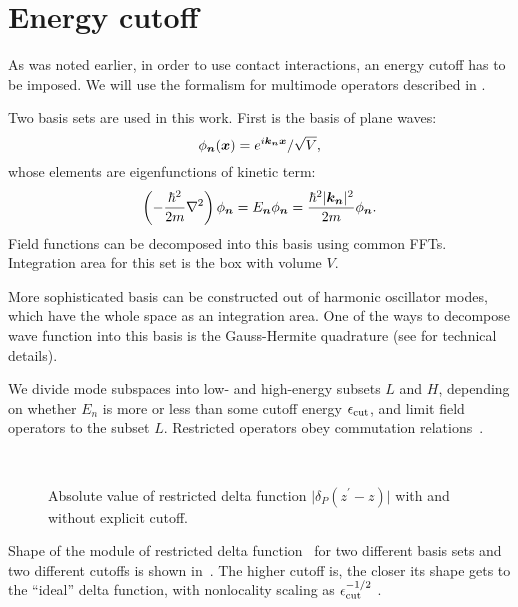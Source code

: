 \section{Energy cutoff}

As was noted earlier, in order to use contact interactions, an energy cutoff has to be imposed.
We will use the formalism for multimode operators described in .

Two basis sets are used in this work.
First is the basis of plane waves:
\[
	\phi_{\boldsymbol{n}}(\boldsymbol{x}) = e^{i \boldsymbol{k}_{\boldsymbol{n}} \boldsymbol{x}} / \sqrt{V},
\]
whose elements are eigenfunctions of kinetic term:
\[
	\left( -\frac{\hbar^2}{2m} \nabla^2 \right) \phi_{\boldsymbol{n}}
	= E_{\boldsymbol{n}} \phi_{\boldsymbol{n}}
	= \frac{\hbar^2 \lvert \boldsymbol{k}_{\boldsymbol{n}} \rvert^2}{2 m} \phi_{\boldsymbol{n}}.
\]
Field functions can be decomposed into this basis using common FFTs.
Integration area for this set is the box with volume $V$.

More sophisticated basis can be constructed out of harmonic oscillator modes,
which have the whole space as an integration area.
One of the ways to decompose wave function into this basis is the Gauss-Hermite quadrature
(see  for technical details).

We divide mode subspaces into low- and high-energy subsets $L$ and $H$,
depending on whether $E_n$ is more or less than some cutoff energy $\epsilon_{\mathrm{cut}}$,
and limit field operators to the subset $L$.
Restricted operators obey commutation relations~.

\begin{figure}
\begin{center}
 \\
\end{center}
\caption{Absolute value of restricted delta function $\lvert \delta_P(z^\prime - z) \rvert$ with and without explicit cutoff.}
\label{fig:wigner-bec:cutoff:restricted-delta}
\end{figure}

Shape of the module of restricted delta function~ for two different basis sets and two different cutoffs is shown in~.
The higher cutoff is, the closer its shape gets to the ``ideal'' delta function,
with nonlocality scaling as $\epsilon_{\mathrm{cut}}^{-1/2}$ .
